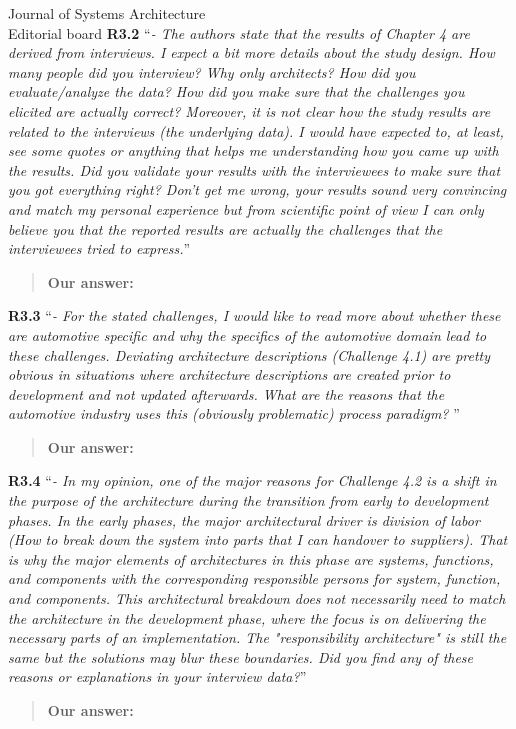 \documentclass[a4paper,10pt]{letter}
\begin{document}
\begin{letter}{Journal of Systems Architecture\\
    Editorial board}
\textbf{R3.2} ``\textit{- The authors state that the results of Chapter 4 are derived from interviews. I expect a bit more details about the study design. How many people did you interview? Why only architects? How did you evaluate/analyze the data? How did you make sure that the challenges you elicited are actually correct? Moreover, it is not clear how the study results are related to the interviews (the underlying data). I would have expected to, at least, see some quotes or anything that helps me understanding how you came up with the results. Did you validate your results with the interviewees to make sure that you got everything right? Don't get me wrong, your results sound very convincing and match my personal experience but from scientific point of view I can only believe you that the reported results are actually the challenges that the interviewees tried to express.}''
\begin{quote}
\textbf{Our answer: }
\end{quote}

\textbf{R3.3} ``\textit{- For the stated challenges, I would like to read more about whether these are automotive specific and why the specifics of the automotive domain lead to these challenges. Deviating architecture descriptions (Challenge 4.1) are pretty obvious in situations where architecture descriptions are created prior to development and not updated afterwards. What are the reasons that the automotive industry uses this (obviously problematic) process paradigm? }''
\begin{quote}
\textbf{Our answer: }
\end{quote}

\textbf{R3.4} ``\textit{- In my opinion, one of the major reasons for Challenge 4.2 is a shift in the purpose of the architecture during the transition from early to development phases. In the early phases, the major architectural driver is division of labor (How to break down the system into parts that I can handover to suppliers). That is why the major elements of architectures in this phase are systems, functions, and components with the corresponding responsible persons for system, function, and components. This architectural breakdown does not necessarily need to match the architecture in the development phase, where the focus is on delivering the necessary parts of an implementation. The "responsibility architecture" is still the same but the solutions may blur these boundaries. Did you find any of these reasons or explanations in your interview data?}''
\begin{quote}
\textbf{Our answer: }
\end{quote}


\end{letter}
\end{document}
